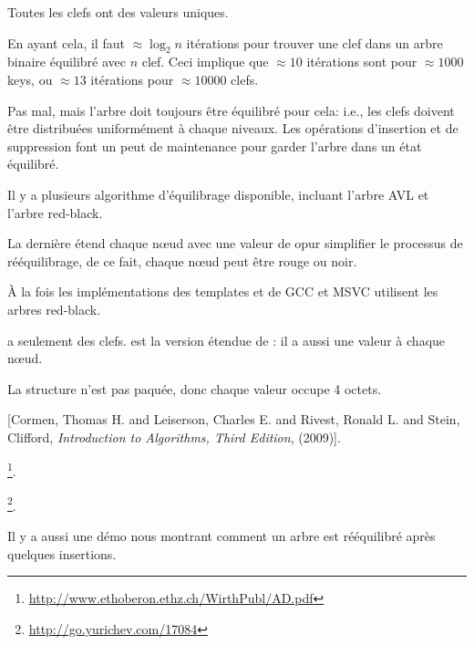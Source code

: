 Toutes les clefs ont des valeurs uniques.

En ayant cela, il faut $\approx \log_{2} n$ itérations pour trouver une clef dans
un arbre binaire équilibré avec $n$ clef.
Ceci implique que $\approx 10$ itérations sont pour $\approx 1000$ keys, ou $\approx 13$
itérations pour $\approx 10000$ clefs.

Pas mal, mais l'arbre doit toujours être équilibré pour cela: i.e., les clefs doivent
être distribuées uniformément à chaque niveaux.
Les opérations d'insertion et de suppression font un peut de maintenance pour garder
l'arbre dans un état équilibré.

Il y a plusieurs algorithme d'équilibrage disponible, incluant l'arbre AVL et l'arbre red-black.

La dernière étend chaque n\oe{}ud avec une valeur de  opur simplifier
le processus de rééquilibrage, de ce fait, chaque n\oe{}ud peut être rouge ou noir.

À la fois les implémentations des templates  et  de GCC
et MSVC utilisent les arbres red-black.

 a seulement des clefs.
 est la version étendue de : il a aussi une valeur à chaque
n\oe{}ud.






La structure n'est pas paquée, donc chaque valeur \Tchar occupe 4 octets.





[Cormen, Thomas H. and Leiserson, Charles E. and Rivest, Ronald L. and Stein, Clifford,
\emph{Introduction to Algorithms, Third Edition}, (2009)].

\footnote{\url{http://www.ethoberon.ethz.ch/WirthPubl/AD.pdf}}.







\footnote{\url{http://go.yurichev.com/17084}}.



Il y a aussi une démo nous montrant comment un arbre est rééquilibré après quelques
insertions.





